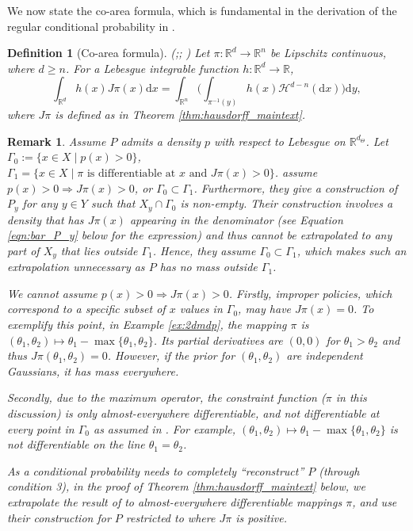 \documentclass{amsart}
\newtheorem{definition}{Definition}
\newtheorem{remark}{Remark}
\begin{document}
We now state the co-area formula, which is fundamental in the derivation of the regular conditional probability in \citet{coarea-diaconis}.

\begin{definition}[Co-area formula](\citealp[Ch. 3.2]{geomeasuretheory_federer};\citealp{coarea-diaconis}; \citealp[Ch. 3]{hausdorff_evans_2015})
    Let $\pi:\mathbb{R}^d \rightarrow \mathbb{R}^n$ be Lipschitz continuous, where $d \geq n$. For a Lebesgue integrable function $h: \mathbb{R}^d \rightarrow \mathbb{R}$,
$$\int_{\mathbb{R}^d} h(x) J\pi(x)\mathrm{d}x=\int_{\mathbb{R}^n} \Bigg(\int_{\pi^{-1}(y)} h(x) \mathcal{H}^{d-n}(\mathrm{d}x) \Bigg)\mathrm{d}y,$$
where $J\pi$ is defined as in Theorem \ref{thm:hausdorff_maintext}.
\label{def:coareaformula}
\end{definition}

\begin{remark}\label{rem:Gamma_0_Gamma_1}
Assume $P$ admits a density $p$ with respect to Lebesgue on $\mathbb{R}^{d_{\Theta}}$. Let $\Gamma_0:=\{x \in X \mid p(x) > 0\}$,  $\Gamma_1=\{x \in X \mid \pi \text{ is differentiable at }x \text{ and } J\pi(x)>0\}$. \citet{coarea-diaconis} assume $p(x)>0 \Longrightarrow J\pi(x)>0$, or $\Gamma_0\subset \Gamma_1$. Furthermore, they give a construction of $P_y$ for any $y\in Y$ such that $X_y \cap \Gamma_0$ is non-empty. Their construction involves a density that has $J\pi(x)$ appearing in the denominator (see Equation \ref{eqn:bar_P_y} below for the expression) and thus cannot be extrapolated to any part of $X_y$ that lies outside $\Gamma_1$. Hence, they assume  $\Gamma_0 \subset \Gamma_1$, which makes such an extrapolation unnecessary as $P$ has no mass outside $\Gamma_1$.

We cannot assume $p(x)>0 \Longrightarrow J\pi(x)>0$. Firstly, improper policies,  which correspond to a specific subset of $x$ values in $\Gamma_0$, may have $J\pi(x)=0$. To exemplify this point, in Example \ref{ex:2dmdp}, the mapping $\pi$ is $(\theta_1,\theta_2)\mapsto \theta_1 - \max\{\theta_1,\theta_2\}$. Its partial derivatives are $(0,0)$ for $\theta_1>\theta_2$ and thus $J\pi(\theta_1,\theta_2)=0$. However, if the prior for $(\theta_1,\theta_2)$ are independent Gaussians, it has mass everywhere.


Secondly, due to the maximum operator, the constraint function ($\pi$ in this discussion) is only almost-everywhere differentiable, and not differentiable at every point in $\Gamma_0$ as assumed in \citep{coarea-diaconis}.  For example, $(\theta_1,\theta_2)\mapsto \theta_1 - \max\{\theta_1,\theta_2\}$ is not differentiable on the line $\theta_1=\theta_2$.

As a conditional probability needs to completely ``reconstruct'' $P$ (through condition 3), in the proof of Theorem \ref{thm:hausdorff_maintext} below, we extrapolate the result of \citet{coarea-diaconis} to almost-everywhere differentiable mappings $\pi$, and use their construction for $P$ restricted to where $J\pi$ is positive.
\end{remark}
\end{document}
